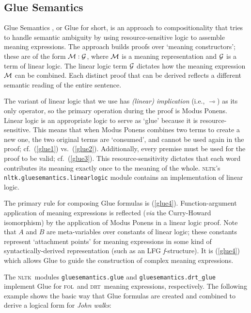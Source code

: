 \documentclass[11pt, a4paper]{article}
\newcommand{\DRT}{\textsc{drt}}
\newcommand{\FOL}{\textsc{fol}}
\newcommand{\NLTK}{\textsc{nltk}}
\begin{document}
\subsection{Glue Semantics}
Glue Semantics \citep{Dalrymple:1999:RRB}, or Glue for
short, is an approach to compositionality that tries to handle
semantic ambiguity by using resource-sensitive logic to assemble
meaning expressions.
The approach builds proofs over `meaning constructors'; these are of the
form $\cal{M}: \cal{G}$, where $\cal{M}$ is a meaning representation and
$\cal{G}$ is a term of linear logic.  The linear logic term $\cal{G}$
dictates how the meaning expression $\cal{M}$ can be combined.  Each
distinct proof that can be derived reflects a different semantic
reading of the entire sentence.

The variant of linear logic that we use has \emph{(linear)
  implication} (i.e., $\multimap$)  as its
only operator, so the primary operation during the proof is Modus
Ponens.  Linear logic is an appropriate logic to serve as `glue'
because it is resource-sensitive.  This means that when Modus Ponens
combines two terms to create a new one, the two original
terms are `consumed', and cannot be used again in the proof;
cf.\ (\ref{glue1}) vs.\ (\ref{glue2}).
Additionally, every premise must be used for the proof to be valid;
cf.\ (\ref{glue3}).
This resource-sensitivity dictates that each word contributes its
meaning exactly once to the meaning of the whole.
\NLTK's \texttt{nltk.gluesemantics.linearlogic} module
contains an implementation of linear logic. 

The primary rule for composing Glue formulas is (\ref{glue4}).
Function-argument application of meaning expressions is reflected (\textit{via}
the Curry-Howard isomorphism) by the application of Modus Ponens in a
linear logic proof. Note that $A$ and $B$ are meta-variables over
constants of linear logic; these constants represent `attachment
points' for meaning expressions in some kind of syntactically-derived
representation (such as an LFG \textit{f}-structure).  It is
(\ref{glue4}) which allows Glue to guide the construction of complex
meaning expressions.  
\vspace{-3ex}

The \NLTK\ modules \texttt{gluesemantics.glue} and
\texttt{gluesemantics.drt\_glue} implement Glue for \FOL\ and
\DRT\ meaning expressions, respectively.
The following example shows the basic way that
Glue formulas are created and combined to derive a logical form for
\textit{John walks}: 
\end{document}
